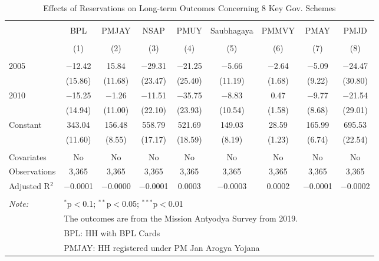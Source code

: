 
\begin{table}[!htbp] \centering 
  \caption{Effects of Reservations on Long-term Outcomes Concerning 8 Key Gov. Schemes} 
  \label{raj_shrug_schemes_05_10} 
\scriptsize 
\begin{tabular}{@{\extracolsep{0pt}}lcccccccc} 
\\[-1.8ex]\hline 
\hline \\[-1.8ex] 
 & BPL & PMJAY & NSAP & PMUY & Saubhagaya & PMMVY & PMAY & PMJD \\ 
\\[-1.8ex] & (1) & (2) & (3) & (4) & (5) & (6) & (7) & (8)\\ 
\hline \\[-1.8ex] 
 2005 & $-$12.42 & 15.84 & $-$29.31 & $-$21.25 & $-$5.66 & $-$2.64 & $-$5.09 & $-$24.47 \\ 
  & (15.86) & (11.68) & (23.47) & (25.40) & (11.19) & (1.68) & (9.22) & (30.80) \\ 
  2010 & $-$15.25 & $-$1.26 & $-$11.51 & $-$35.75 & $-$8.83 & 0.47 & $-$9.77 & $-$21.54 \\ 
  & (14.94) & (11.00) & (22.10) & (23.93) & (10.54) & (1.58) & (8.68) & (29.01) \\ 
  Constant & 343.04 & 156.48 & 558.79 & 521.69 & 149.03 & 28.59 & 165.99 & 695.53 \\ 
  & (11.60) & (8.55) & (17.17) & (18.59) & (8.19) & (1.23) & (6.74) & (22.54) \\ 
 \hline \\[-1.8ex] 
Covariates & No & No & No & No & No & No & No & No \\ 
Observations & 3,365 & 3,365 & 3,365 & 3,365 & 3,365 & 3,365 & 3,365 & 3,365 \\ 
Adjusted R$^{2}$ & $-$0.0001 & $-$0.0000 & $-$0.0001 & 0.0003 & $-$0.0003 & 0.0002 & $-$0.0001 & $-$0.0002 \\ 
\hline 
\hline \\[-1.8ex] 
\textit{Note:}  & \multicolumn{8}{l}{$^{*}$p$<$0.1; $^{**}$p$<$0.05; $^{***}$p$<$0.01} \\ 
 & \multicolumn{8}{l}{The outcomes are from the Mission Antyodya Survey from 2019.} \\ 
 & \multicolumn{8}{l}{BPL: HH with BPL Cards} \\ 
 & \multicolumn{8}{l}{PMJAY: HH registered under PM Jan Arogya Yojana} \\ 

\end{tabular}
\end{table}
